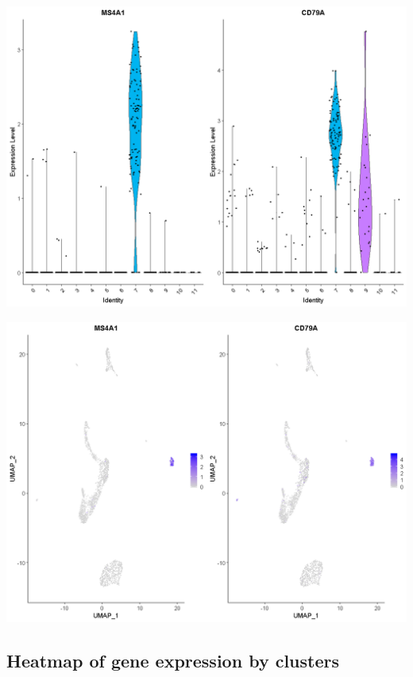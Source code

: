 \documentclass[]{book}
\begin{document}
\includegraphics[width=16.67in]{_book/10X_files/figure-html/gene_markers}

\includegraphics[width=16.67in]{_book/10X_files/figure-html/gene_markers2}

\hypertarget{heatmap-of-gene-expression-by-clusters}{%
\subsection{Heatmap of gene expression by clusters}\label{heatmap-of-gene-expression-by-clusters}}
\end{document}
